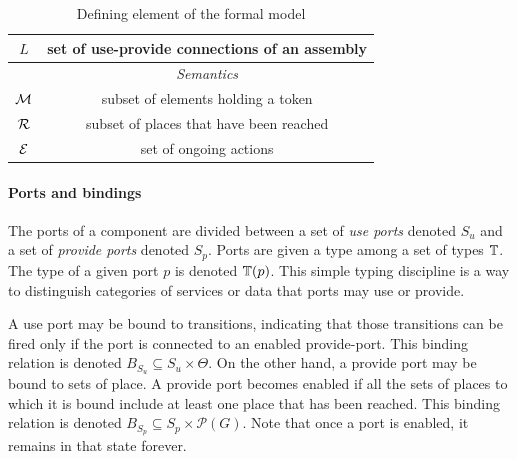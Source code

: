 \begin{table}[tp]
{\begin{tabular}{|c|c|}
      $L$ & set of use-provide connections of an assembly\\
      \hline
      \hline
      & \emph{Semantics}\\
      \hline
      $\mathcal{M}$ & subset of elements holding a token\\
      $\mathcal{R}$ & subset of places that have been reached\\
      $\mathcal{E}$ & set of ongoing actions\\
      \hline
    \end{tabular}
  }
  \caption{Defining element of the \mad formal model}
  \label{tab:not}
\end{table}

\paragraph{Ports and bindings}{

The ports of a component are divided between a set of \emph{use ports}
denoted $S_{u}$ and a set of \emph{provide ports} denoted
$S_{p}$. Ports are given a type among a set of types $\mathbb{T}$. The
type of a given port $p$ is denoted $\mathbb{T}(p)$. This simple typing
discipline is a way to distinguish categories of services or data that
ports may use or provide.

A use port may be bound to transitions, indicating that those
transitions can be fired only if the port is connected to an enabled
provide-port. This binding relation is denoted $B_{S_{u}} \subseteq
S_u \times \Theta$. On the other hand, a provide port may be bound to
sets of place. A provide port becomes enabled if all the sets of
places to which it is bound include at least one place that has been
reached. This binding relation is denoted $B_{S_{p}} \subseteq S_p
\times \mathcal{P}(G)$. Note that once a port is enabled, it remains
in that state forever.



}
